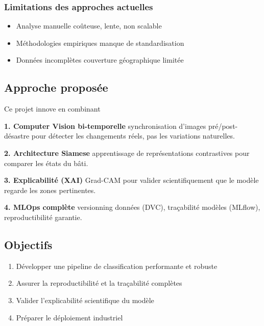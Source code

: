 \subsubsection{Limitations des approches actuelles}
\begin{itemize}
    \item Analyse manuelle\: coûteuse, lente, non scalable
    \item Méthodologies empiriques\: manque de standardisation
    \item Données incomplètes\: couverture géographique limitée
\end{itemize}

\subsection{Approche proposée}
Ce projet innove en combinant\:

\textbf{1. Computer Vision bi-temporelle}\: synchronisation d'images pré/post-désastre pour détecter 
les changements réels, pas les variations naturelles.

\textbf{2. Architecture Siamese}\: apprentissage de représentations contrastives pour comparer 
les états du bâti.

\textbf{3. Explicabilité (XAI)}\: Grad-CAM pour valider scientifiquement que le modèle 
regarde les zones pertinentes.

\textbf{4. MLOps complète}\: versionning données (DVC), traçabilité modèles (MLflow), 
reproductibilité garantie.

\subsection{Objectifs}
\begin{enumerate}
    \item Développer une pipeline de classification performante et robuste
    \item Assurer la reproductibilité et la traçabilité complètes
    \item Valider l'explicabilité scientifique du modèle
    \item Préparer le déploiement industriel
\end{enumerate}



